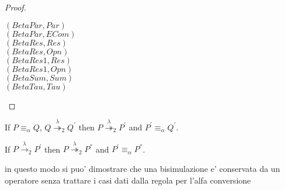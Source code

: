 \begin{lemma}
\begin{proof}
\begin{description}
      \item[$(BetaPar, Par)$]
      \item[$(BetaPar, ECom)$]
      \item[$(BetaRes, Res)$]
      \item[$(BetaRes, Opn)$]
      \item[$(BetaRes1, Res)$]
      \item[$(BetaRes1, Opn)$]
      \item[$(BetaSum, Sum)$]
      \item[$(BetaTau, Tau)$]
    \end{description}
  \end{proof}
\end{lemma}

\begin{corollary}
  If $P\equiv_{\alpha} Q$, $Q\stackrel{\lambda}{\twoheadrightarrow}_{2} Q^{'}$ then $P\stackrel{\lambda}{\twoheadrightarrow}_{2} P^{'}$ and $P^{'}\equiv_{\alpha} Q^{'}$.
\end{corollary}

\begin{lemma}
  If $P\xrightarrow{\lambda}_{2} P^{'}$ then $P\stackrel{\lambda}{\twoheadrightarrow}_{2} P^{''}$ and $P^{'}\equiv_{\alpha} P^{''}$.
\end{lemma}


in questo modo si puo' dimostrare che una bisimulazione e' conservata da un operatore senza trattare i casi dati dalla regola per l'alfa conversione
